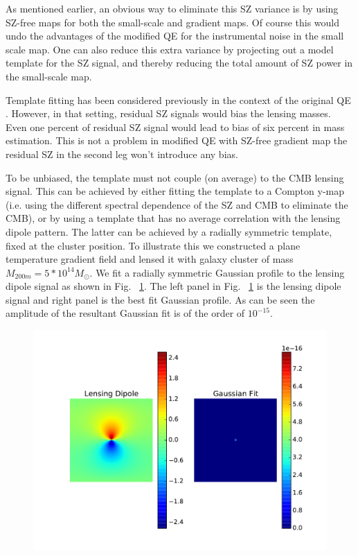 As mentioned earlier, an obvious way to eliminate this SZ variance is by using SZ-free maps for both the small-scale and gradient maps. 
Of course this would undo the advantages of the modified QE for the instrumental noise in the small scale map. 
One can also reduce this extra variance by projecting out a model template for the SZ signal, and thereby reducing the total amount of SZ power in the small-scale map. 

Template fitting has been considered previously in the context of the original QE \citep{tbd?}. 
However, in that setting, residual SZ signals would bias the lensing masses. 
 Even one percent of residual SZ signal would lead to bias of six percent in mass estimation. 
This is not a problem in modified QE with SZ-free gradient map the residual SZ in the second leg won't introduce any bias. %

To be unbiased, the template must not couple (on average) to the  CMB lensing signal. 
This can be achieved by either fitting the template to a Compton  y-map (i.e. using the different spectral dependence of the SZ and CMB to eliminate the CMB), or by using a template that has no average correlation with the lensing dipole pattern. 
The latter can be achieved by a radially symmetric template, fixed at the cluster position.
To illustrate this we constructed a plane temperature gradient field and lensed it with galaxy cluster of mass $M_{200m} = 5*10^{14}M_{\odot}$. 
We fit a radially symmetric Gaussian profile to the lensing dipole signal as shown in Fig. ~\ref{fig:no_bias}. 
 The left panel in Fig. ~\ref{fig:no_bias} is the lensing dipole signal and right panel is the best fit Gaussian profile. 
 As can be seen the amplitude of the resultant Gaussian fit is of the order of $10^{-15}$.

\begin{figure}
\includegraphics[width=\linewidth]{figs/template_fitting_bias.pdf}
 \caption{
 } 
\label{fig:no_bias}
\end{figure}

